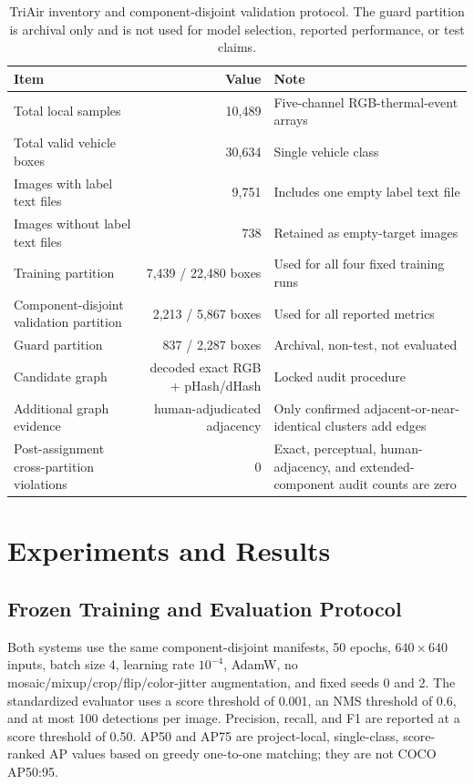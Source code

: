 \begin{table}[t]
\centering
\caption{TriAir inventory and component-disjoint validation protocol. The guard partition is archival only and is not used for model selection, reported performance, or test claims.}
\label{tab:protocol}
\small
\begin{tabularx}{\textwidth}{@{}l r Y@{}}
\toprule
Item & Value & Note\\
\midrule
Total local samples & 10,489 & Five-channel RGB-thermal-event arrays\\
Total valid vehicle boxes & 30,634 & Single vehicle class\\
Images with label text files & 9,751 & Includes one empty label text file\\
Images without label text files & 738 & Retained as empty-target images\\
Training partition & 7,439 / 22,480 boxes & Used for all four fixed training runs\\
Component-disjoint validation partition & 2,213 / 5,867 boxes & Used for all reported metrics\\
Guard partition & 837 / 2,287 boxes & Archival, non-test, not evaluated\\
Candidate graph & decoded exact RGB + pHash/dHash & Locked audit procedure\\
Additional graph evidence & human-adjudicated adjacency & Only confirmed adjacent-or-near-identical clusters add edges\\
Post-assignment cross-partition violations & 0 & Exact, perceptual, human-adjacency, and extended-component audit counts are zero\\
\bottomrule
\end{tabularx}
\end{table}

\section{Experiments and Results}
\subsection{Frozen Training and Evaluation Protocol}
Both systems use the same component-disjoint manifests, 50 epochs, $640\times640$ inputs, batch size 4, learning rate $10^{-4}$, AdamW, no mosaic/mixup/crop/flip/color-jitter augmentation, and fixed seeds 0 and 2. The standardized evaluator uses a score threshold of 0.001, an NMS threshold of 0.6, and at most 100 detections per image. Precision, recall, and F1 are reported at a score threshold of 0.50. AP50 and AP75 are project-local, single-class, score-ranked AP values based on greedy one-to-one matching; they are not COCO AP50:95.

